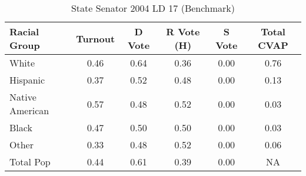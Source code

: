 \begin{table}[htb]
\begin{center}
\caption{State Senator 2004 LD 17 (Benchmark)}
\label{stsen04_cvap_ld_17}
\begin{tabular}{lccccc}
  \hline
Racial Group & Turnout & D Vote & R Vote (H) & S Vote & Total CVAP \\ 
  \hline
    White & 0.46  & 0.64  & 0.36  & 0.00  & 0.76 \\
    Hispanic & 0.37  & 0.52  & 0.48  & 0.00  & 0.13 \\
    Native American & 0.57  & 0.48  & 0.52  & 0.00  & 0.03 \\
    Black & 0.47  & 0.50  & 0.50  & 0.00  & 0.03 \\
    Other & 0.33  & 0.48  & 0.52  & 0.00  & 0.06 \\
    Total Pop & 0.44  & 0.61  & 0.39  & 0.00  & NA \\
   \hline
\end{tabular}
\end{center}
\end{table}